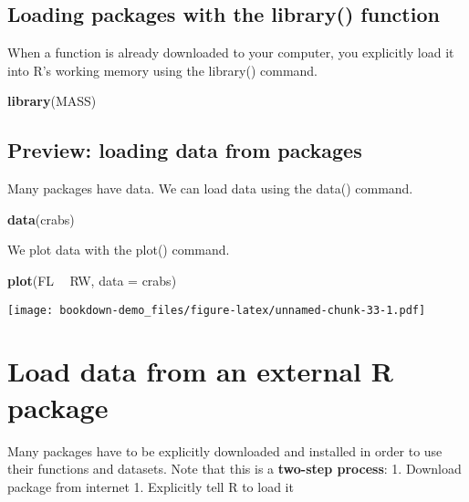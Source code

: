 \documentclass[]{book}
\newenvironment{Shaded}{\begin{snugshade}}{\end{snugshade}}
\newcommand{\KeywordTok}[1]{\textcolor[rgb]{0.13,0.29,0.53}{\textbf{#1}}}
\newcommand{\DataTypeTok}[1]{\textcolor[rgb]{0.13,0.29,0.53}{#1}}
\newcommand{\StringTok}[1]{\textcolor[rgb]{0.31,0.60,0.02}{#1}}
\newcommand{\OperatorTok}[1]{\textcolor[rgb]{0.81,0.36,0.00}{\textbf{#1}}}
\newcommand{\NormalTok}[1]{#1}
\theoremstyle{definition}
\theoremstyle{definition}
\theoremstyle{definition}
\theoremstyle{remark}
\begin{document}
\subsection{\texorpdfstring{\protect\hyperlink{section-3}{} Loading
packages with the library()
function}{ Loading packages with the library() function}}\label{loading-packages-with-the-library-function}

When a function is already downloaded to your computer, you explicitly
load it into R's working memory using the library() command.

\begin{Shaded}
\begin{Highlighting}[]
\KeywordTok{library}\NormalTok{(MASS)}
\end{Highlighting}
\end{Shaded}

\subsection{Preview: loading data from
packages}\label{preview-loading-data-from-packages}

Many packages have data. We can load data using the data() command.

\begin{Shaded}
\begin{Highlighting}[]
\KeywordTok{data}\NormalTok{(crabs)}
\end{Highlighting}
\end{Shaded}

We plot data with the plot() command.

\begin{Shaded}
\begin{Highlighting}[]
\KeywordTok{plot}\NormalTok{(FL }\OperatorTok{~}\StringTok{ }\NormalTok{RW, }\DataTypeTok{data =}\NormalTok{ crabs)}
\end{Highlighting}
\end{Shaded}

\texttt{[image: bookdown-demo\_files/figure-latex/unnamed-chunk-33-1.pdf]}

\section{Load data from an external R
package}\label{load-data-from-an-external-r-package}

Many packages have to be explicitly downloaded and installed in order to
use their functions and datasets. Note that this is a \textbf{two-step
process}: 1. Download package from internet 1. Explicitly tell R to load
it
\end{document}

